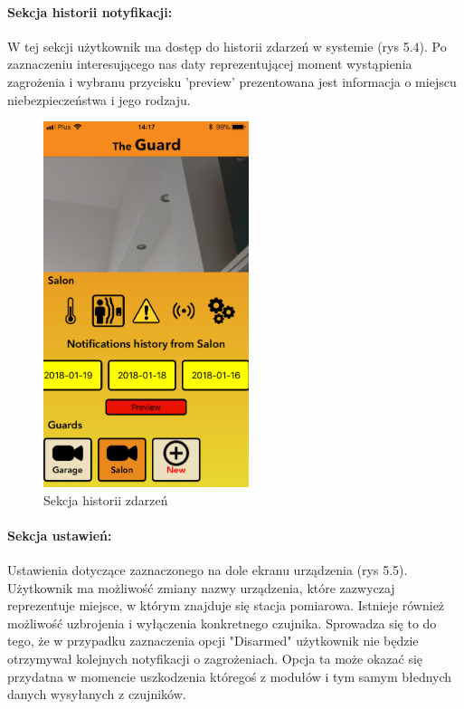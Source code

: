 \paragraph{Sekcja historii notyfikacji:}
W tej sekcji użytkownik ma dostęp do historii zdarzeń w systemie (rys 5.4). Po zaznaczeniu interesującego nas daty reprezentującej moment wystąpienia zagrożenia i wybranu przycisku 'preview' prezentowana jest informacja o miejscu niebezpieczeństwa i jego rodzaju. 

\begin{figure}[h]
	\centering
	\includegraphics[width=6cm]{history.png}
	\caption{Sekcja historii zdarzeń}
\end{figure}


\paragraph{Sekcja ustawień:}
Ustawienia dotyczące zaznaczonego na dole ekranu urządzenia (rys 5.5). Użytkownik ma możliwość zmiany nazwy urządzenia, które zazwyczaj reprezentuje miejsce, w którym znajduje się stacja pomiarowa. Istnieje również możliwość uzbrojenia i wyłączenia konkretnego czujnika. Sprowadza się to do tego, że w przypadku zaznaczenia opcji "Disarmed" użytkownik nie będzie otrzymywał kolejnych notyfikacji o zagrożeniach. Opcja ta może okazać się przydatna w momencie uszkodzenia któregoś z modułów i tym samym błednych danych wysyłanych z czujników.

